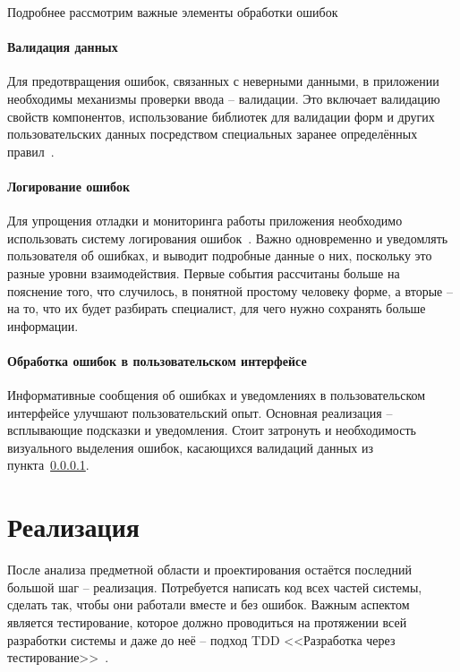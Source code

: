 \documentclass[a4paper,article]{article}
\begin{document}
\begin{sloppypar}
    Подробнее рассмотрим важные элементы обработки ошибок

    \paragraph{Валидация данных}\label{Проектирование клиента. Валидация данных}

    Для предотвращения ошибок, связанных с неверными данными, в приложении необходимы механизмы проверки ввода -- валидации. Это включает валидацию свойств компонентов, использование библиотек для валидации форм и других пользовательских данных посредством специальных заранее определённых правил~\cite{baeldungbook}.

    \paragraph{Логирование ошибок}

    Для упрощения отладки и мониторинга работы приложения необходимо использовать систему логирования ошибок~\cite{cleancode}. Важно одновременно и уведомлять пользователя об ошибках, и выводит подробные данные о них, поскольку это разные уровни взаимодействия. Первые события рассчитаны больше на пояснение того, что случилось, в понятной простому человеку форме, а вторые -- на то, что их будет разбирать специалист, для чего нужно сохранять больше информации.

    \paragraph{Обработка ошибок в пользовательском интерфейсе}

    Информативные сообщения об ошибках и уведомлениях в пользовательском интерфейсе улучшают пользовательский опыт. Основная реализация -- всплывающие подсказки и уведомления. Стоит затронуть и необходимость визуального выделения ошибок, касающихся валидаций данных из пункта~\ref{Проектирование клиента. Валидация данных}.

    \newpage

    \section{Реализация}\label{Реализация}

    После анализа предметной области и проектирования остаётся последний большой шаг -- реализация. Потребуется написать код всех частей системы, сделать так, чтобы они работали вместе и без ошибок. Важным аспектом является тестирование, которое должно проводиться на протяжении всей разработки системы и даже до неё -- подход TDD <<Разработка через тестирование>>~\cite{tdd}.


\end{sloppypar}
\end{document}
